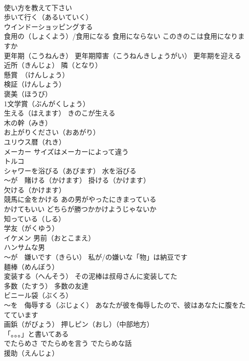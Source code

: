 \documentclass[8pt]{extreport}
\begin{document}
\begin{CJK}{UTF8}{min}
\\	使い方を教えて下さい
\\	歩いて行く（あるいていく）
\\	ウインドーショッピングする
\\	食用の（しょくよう）/食用になる 食用にならない このきのこは食用になりますか
\\	更年期（こうねんき） 更年期障害（こうねんきしょうがい） 更年期を迎える
\\	近所（きんじょ） 隣（となり）
\\	懸賞　（けんしょう）
\\	検証（けんしょう） 
\\	褒美（ほうび）
\\	1文学賞（ぶんがくしょう）
\\	生える（はえます） きのこが生える
\\	木の幹（みき）
\\	お上がりください（おあがり）
\\	ユリウス暦（れき）
\\	メーカー サイズはメーカーによって違う
\\	トルコ
\\	シャワーを浴びる（あびます） 水を浴びる
\\	～が　賭ける（かけます） 掛ける（かけます）
\\	欠ける（かけます）
\\	競馬に金をかける あの男がやったにきまっている
\\	かけてもいい どちらが勝つかかけようじゃないか
\\	知っている（しる）
\\	学友（がくゆう）
\\	イケメン 男前（おとこまえ） 
\\	ハンサムな男
\\	～が　嫌いです（きらい） 私が/の嫌いな「物」は納豆です
\\	麺棒（めんぼう）
\\	変装する（へんそう） その泥棒は叔母さんに変装してた
\\	多数（たすう） 多数の友達
\\	ビニール袋（ぶくろ）
\\	～を　侮辱する（ぶじょく） あなたが彼を侮辱したので、彼はあなたに腹をたてています
\\	画鋲（がびょう） 押しピン（おし）（中部地方）
\\	「。。。」と書いてある
\\	でたらめさ でたらめを言う でたらめな話
\\	援助（えんじょ）

\end{CJK}
\end{document}
